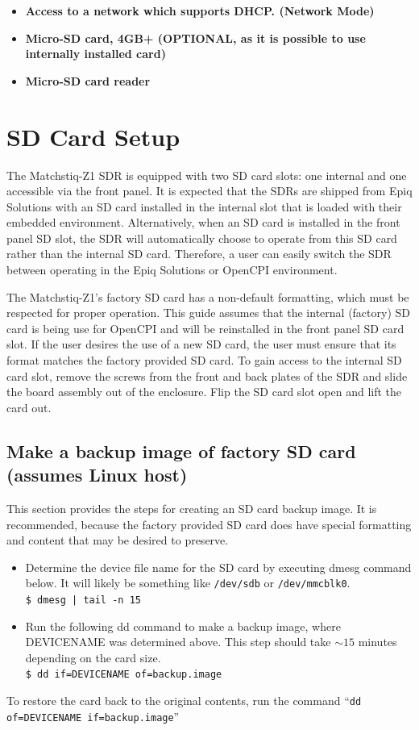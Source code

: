 \begin{flushleft}
\begin{itemize}
\item \textbf{Access to a network which supports DHCP. (Network Mode)}
\item \textbf{Micro-SD card, 4GB+ (OPTIONAL, as it is possible to use internally installed card) }
\item \textbf{Micro-SD card reader}
\end{itemize}
\end{flushleft}

\newpage
\section{SD Card Setup}
\label{sec:SD_Card_Setup}
The Matchstiq-Z1 SDR is equipped with two SD card slots: one internal and one accessible via the front panel. It is expected that the SDRs are shipped from Epiq Solutions with an SD card installed in the internal slot that is loaded with their embedded environment. Alternatively, when an SD card is installed in the front panel SD slot, the SDR will automatically choose to operate from this SD card rather than the internal SD card. Therefore, a user can easily switch the SDR between operating in the Epiq Solutions or OpenCPI environment.

The Matchstiq-Z1's factory SD card has a non-default formatting, which must be respected for proper operation. This guide assumes that the internal (factory) SD card is being use for OpenCPI and will be reinstalled in the front panel SD card slot. If the user desires the use of a new SD card, the user must ensure that its format matches the factory provided SD card. To gain access to the internal SD card slot, remove the screws from the front and back plates of the SDR and slide the board assembly out of the enclosure. Flip the SD card slot open and lift the card out.

\subsection{Make a backup image of factory SD card (assumes Linux host)}
This section provides the steps for creating an SD card backup image. It is recommended, because the factory provided SD card does have special formatting and content that may be desired to preserve.

\begin{itemize}
\item Determine the device file name for the SD card by executing dmesg command below. It will likely be something like \texttt{/dev/sdb} or \texttt{/dev/mmcblk0}.\\
\texttt{\$ dmesg | tail -n 15} \\
\item Run the following dd command to make a backup image, where DEVICENAME was determined above. This step should take $\sim15$ minutes depending on the card size.\\ \medskip
\texttt{\$ dd if=DEVICENAME of=backup.image}
\end{itemize}
\noindent To restore the card back to the original contents, run the command ``\texttt{dd of=DEVICENAME if=backup.image}''

